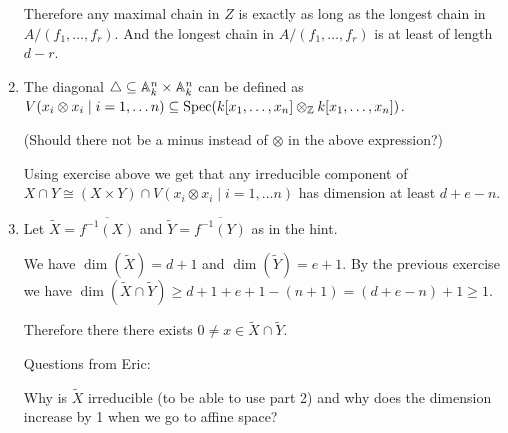 \begin{exercise}{1}
\begin{enumerate}
{                Therefore any maximal chain in $Z$ is exactly as long as the
                longest chain in $A / (f_1, \dots, f_r)$. And the longest chain
                in $A / (f_1, \dots, f_r)$ is at least of length $d - r$.
            }
        \item{
                The diagonal $\triangle \subseteq \mathbb{A}^n_k \times \mathbb{A}^n_k$ can
                be defined as $V(x_i \otimes x_i \mid i = 1, \dots n) \subseteq
                \operatorname{Spec}(k[x_1, \dots, x_n] \otimes_{\mathbb{Z}} k[x_1, \dots, x_n])$.

                (Should there not be a minus instead of $\otimes$ in the above expression?)

                Using exercise above we get that any irreducible component of
                $X \cap Y \cong (X \times Y) \cap V(x_i \otimes x_i \mid i = 1,
                \dots n)$ has dimension at least $d + e - n$.
            }
        \item{
                Let $\tilde{X} = \overline{f^{-1}(X)}$ and $\tilde{Y} = \overline{f^{-1}(Y)}$ as in
                the hint.

                We have $\dim(\tilde{X}) = d + 1$ and $\dim(\tilde{Y}) = e + 1$.
                By the previous exercise we have $\dim(\tilde{X} \cap \tilde{Y})
                \geq d + 1 + e + 1 - (n + 1) = (d + e - n) + 1 \geq 1$.

                Therefore there there exists $0 \not= x \in \tilde{X} \cap
                \tilde{Y}$.

                Questions from Eric:
                
                Why is $\tilde{X}$ irreducible (to be able to use part 2) and why does the dimension 
                increase by 1 when we go to affine space?
            }
    \end{enumerate}
\end{exercise}

